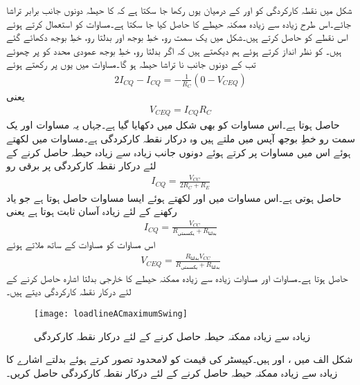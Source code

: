 شکل  میں نقطہ کارکردگی کو  اور   کے درمیان یوں رکھا جا سکتا ہے کہ  کا حیطہ دونوں جانب برابر تراشا جائے۔اس طرح زیادہ سے زیادہ ممکنہ حیطے کا  حاصل کیا جا سکتا ہے۔مساوات  کو استعمال کرتے ہوئے اس نقطے کو حاصل کرتے ہیں۔شکل  میں یک سمت رو، خطِ بوجھ اور بدلتا رو، خطِ بوجھ دکھائے گئے ہیں۔ کو نظر انداز کرتے ہوئے ہم دیکھتے ہیں کہ اگر بدلتا رو، خطِ بوجھ عمودی محدد کو  پر چھوئے تب  کے دونوں جانب نا تراشا حیطہ  ہو گا۔مساوات  میں یوں  پر  رکھتے ہوئے
 \begin{align*}
2 I_{CQ}-I_{CQ}=-\frac{1}{R_C} \left(0-V_{CEQ} \right)
\end{align*}
یعنی
 \begin{align}\label{مساوات_ٹرانزسٹر_زیادہ_حیطہ_الف}
V_{CEQ}=I_{CQ} R_C
\end{align}
حاصل ہوتا ہے۔اس مساوات کو بھی شکل میں دکھایا گیا ہے۔جہاں یہ مساوات اور یک سمت رو خطِ بوجھ آپس میں ملتے ہیں وہ درکار نقطہ کارکردگی ہے۔مساوات  میں  لکھتے ہوئے اس میں مساوات  پر کرتے ہوئے دونوں جانب زیادہ سے زیادہ حیطہ حاصل کرنے کے لئے درکار نقطہ کارکردگی پر برقی رو 
\begin{align*}
I_{CQ}=\frac{V_{CC}}{2 R_C+R_E}
\end{align*}
حاصل ہوتی ہے۔اس مساوات میں  اور  لکھتے ہوئے ایسا مساوات حاصل ہوتا ہے جو یاد رکھنے کے لئے زیادہ آسان ثابت ہوتا ہے یعنی
\begin{align}\label{مساوات_ٹرانزسٹر_زیادہ_حیطہ_ب}
I_{CQ}=\frac{V_{CC}}{R_{\text{یکسمتی}}+R_{\text{بدلتا}}}
\end{align}
اس مساوات کو مساوات  کے ساتھ ملاتے ہوئے
\begin{align}\label{مساوات_ٹرانزسٹر_زیادہ_حیطہ_پ}
V_{CEQ}=\frac{R_{\text{بدلتا}} V_{CC}}{R_{\text{یکسمتی}}+R_{\text{بدلتا}}}
\end{align}
حاصل ہوتا ہے۔مساوات  اور مساوات  زیادہ سے زیادہ ممکنہ حیطے کا خارجی بدلتا اشارہ حاصل کرنے کے لئے درکار نقطہ کارکردگی دیتے ہیں۔ 
%
\begin{figure}
\centering
\texttt{[image: loadlineACmaximumSwing]}
\caption{زیادہ سے زیادہ ممکنہ حیطہ حاصل کرنے کے لئے درکار نقطہ کارکردگی}
\label{شکل_ٹرانزسٹر_زیادہ_حیطہ_نکتہ_کارکردگی}
\end{figure}
شکل  الف میں ،  اور
  ہیں۔کپیسٹر کی قیمت کو لامحدود تصور کرتے ہوئے بدلتے اشارے کا زیادہ سے زیادہ ممکنہ حیطہ حاصل کرنے کے لئے درکار نقطہ کارکردگی حاصل کریں۔

